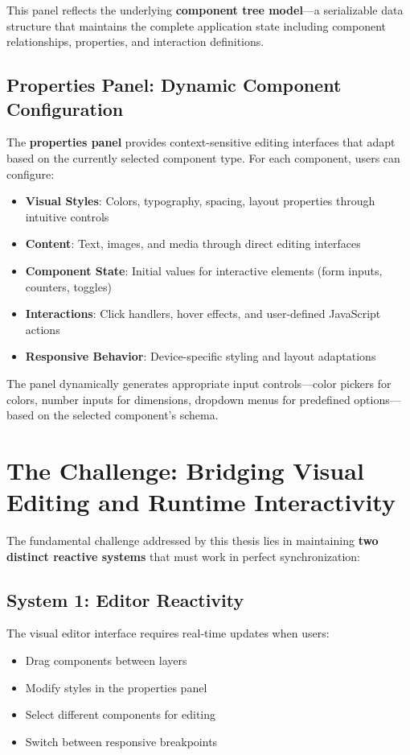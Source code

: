 \documentclass[oneside,11pt]{book}
\begin{document}
This panel reflects the underlying \textbf{component tree model}—a serializable data structure that maintains the complete application state including component relationships, properties, and interaction definitions.

\subsection{Properties Panel: Dynamic Component Configuration}

The \textbf{properties panel} provides context-sensitive editing interfaces that adapt based on the currently selected component type. For each component, users can configure:

\begin{itemize}
    \item \textbf{Visual Styles}: Colors, typography, spacing, layout properties through intuitive controls
    \item \textbf{Content}: Text, images, and media through direct editing interfaces
    \item \textbf{Component State}: Initial values for interactive elements (form inputs, counters, toggles)
    \item \textbf{Interactions}: Click handlers, hover effects, and user-defined JavaScript actions
    \item \textbf{Responsive Behavior}: Device-specific styling and layout adaptations
\end{itemize}

The panel dynamically generates appropriate input controls—color pickers for colors, number inputs for dimensions, dropdown menus for predefined options—based on the selected component's schema.

\section{The Challenge: Bridging Visual Editing and Runtime Interactivity}
\label{sec:bridging-challenge}

The fundamental challenge addressed by this thesis lies in maintaining \textbf{two distinct reactive systems} that must work in perfect synchronization:

\subsection{System 1: Editor Reactivity}
The visual editor interface requires real-time updates when users:
\begin{itemize}
    \item Drag components between layers
    \item Modify styles in the properties panel
    \item Select different components for editing
    \item Switch between responsive breakpoints
\end{itemize}
\end{document}
